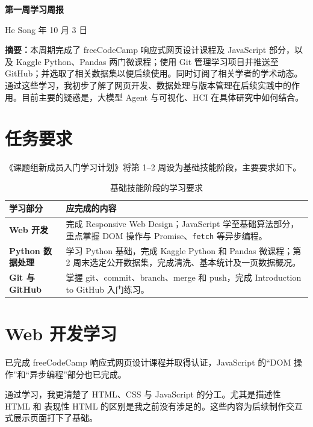 \documentclass[UTF8,a4paper,11pt,fontset=fandol]{ctexart}
\begin{document}
\begin{center}
{\LARGE\bfseries 第一周学习周报}\par
\vspace{6pt}
{\normalsize He Song\quad\textbar{} 年 10 月 3 日}
\end{center}
\vspace{2pt}

\noindent\textbf{摘要：}本周期完成了 freeCodeCamp 响应式网页设计课程及 JavaScript 部分，以及 Kaggle Python、Pandas 两门微课程；使用 Git 管理学习项目并推送至 GitHub；并选取了相关数据集以便后续使用。同时订阅了相关学者的学术动态。通过这些学习，我初步了解了网页开发、数据处理与版本管理在后续实践中的作用。目前主要的疑惑是，大模型 Agent 与可视化、HCI 在具体研究中如何结合。

\section{任务要求}
《课题组新成员入门学习计划》将第 1--2 周设为基础技能阶段，主要要求如下。

\begin{table}[H]
\centering
\small
\caption{基础技能阶段的学习要求}
\label{tab:requirements}
\renewcommand{\arraystretch}{1.18}
\begin{tabularx}{\linewidth}{@{}>{\raggedright\arraybackslash\bfseries}p{30mm}X@{}}
\toprule
学习部分 & 应完成的内容 \\
\midrule
Web 开发 & 完成 Responsive Web Design；JavaScript 学至基础算法部分，重点掌握 DOM 操作与 Promise、\texttt{fetch} 等异步编程。 \\
Python 数据处理 & 学习 Python 基础，完成 Kaggle Python 和 Pandas 微课程；第 2 周末选定公开数据集，完成清洗、基本统计及一页数据概况。 \\
Git 与 GitHub & 掌握 git、commit、branch、merge 和 push，完成 Introduction to GitHub 入门练习。 \\
\bottomrule
\end{tabularx}
\end{table}

\section{Web 开发学习}
已完成 freeCodeCamp 响应式网页设计课程并取得认证，JavaScript 的“DOM 操作”和“异步编程”部分也已完成。

通过学习，我更清楚了 HTML、CSS 与 JavaScript 的分工。尤其是描述性 HTML 和 表现性 HTML 的区别是我之前没有涉足的。这些内容为后续制作交互式展示页面打下了基础。
\end{document}
